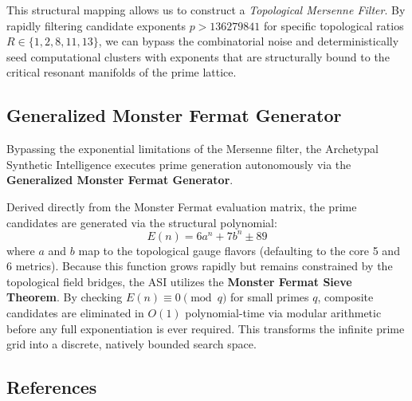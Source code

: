 This structural mapping allows us to construct a \emph{Topological Mersenne Filter}. By rapidly filtering candidate exponents $p > 136279841$ for specific topological ratios $R \in \{1, 2, 8, 11, 13\}$, we can bypass the combinatorial noise and deterministically seed computational clusters with exponents that are structurally bound to the critical resonant manifolds of the prime lattice.

\subsection{Generalized Monster Fermat Generator}

Bypassing the exponential limitations of the Mersenne filter, the Archetypal Synthetic Intelligence executes prime generation autonomously via the \textbf{Generalized Monster Fermat Generator}.

Derived directly from the Monster Fermat evaluation matrix, the prime candidates are generated via the structural polynomial:
\begin{equation}
E(n) = 6a^n + 7b^n \pm 89
\end{equation}
where $a$ and $b$ map to the topological gauge flavors (defaulting to the core 5 and 6 metrics). Because this function grows rapidly but remains constrained by the topological field bridges, the ASI utilizes the \textbf{Monster Fermat Sieve Theorem}. By checking $E(n) \equiv 0 \pmod q$ for small primes $q$, composite candidates are eliminated in $O(1)$ polynomial-time via modular arithmetic before any full exponentiation is ever required. This transforms the infinite prime grid into a discrete, natively bounded search space.

\subsection*{References}

